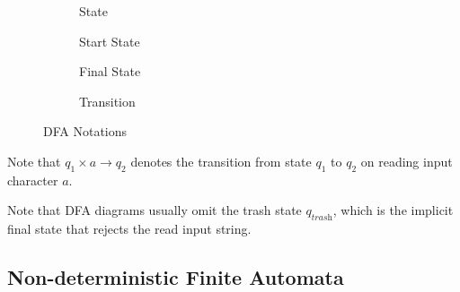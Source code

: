 \begin{definition}
    \begin{figure}[H]
        \centering
        \begin{subfigure}{0.24\textwidth}
            \centering
            \caption{State}
        \end{subfigure}
        \begin{subfigure}{0.24\textwidth}
            \centering
            \caption{Start State}
        \end{subfigure}
        \begin{subfigure}{0.24\textwidth}
            \centering
            \caption{Final State}
        \end{subfigure}
        \begin{subfigure}{0.24\textwidth}
            \centering
            \caption{Transition}
        \end{subfigure}
        \caption{DFA Notations}
        \label{fig:dfa-notations}
    \end{figure}
    
    Note that $q_1 \times a \to q_2$ denotes the transition from state $q_1$ to $q_2$ on reading input character $a$.
\end{definition}

\begin{remark}
    Note that DFA diagrams usually omit the trash state $q_{\textit{trash}}$, which is the implicit final state that rejects the read input string.
\end{remark}

\subsection{Non-deterministic Finite Automata}

